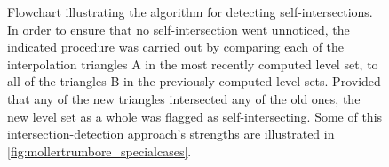 \begin{figure}[htpb]
    \centering
    \resizebox{0.9\linewidth}{!}{}
    \caption[Flowchart illustrating the algorithm for detecting
    self-intersections]
    {Flowchart illustrating the algorithm for detecting self-intersections.
        In order to ensure that no self-intersection went unnoticed, the
        indicated procedure was carried out by comparing each of the
        interpolation triangles A in the most recently computed level set,
        to all of the triangles B in the previously computed level sets.
        Provided that any of the new triangles intersected any of the old ones,
        the new level set as a whole was flagged as self-intersecting. Some
        of this intersection-detection approach's strengths are illustrated
        in \cref{fig:mollertrumbore_specialcases}.
    }
    \label{fig:intersection_flowchart}
\end{figure}

